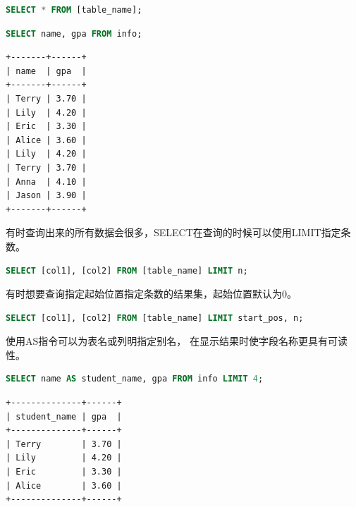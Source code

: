 \documentclass[12pt, openany, oneside]{book}
\begin{document}
\begin{lstlisting}[language=SQL]
SELECT * FROM [table_name];
\end{lstlisting}

\vspace{0.5cm}


\begin{lstlisting}[language=SQL]
SELECT name, gpa FROM info;
\end{lstlisting}

\begin{tcolorbox}
    \begin{verbatim}
+-------+------+
| name  | gpa  |
+-------+------+
| Terry | 3.70 |
| Lily  | 4.20 |
| Eric  | 3.30 |
| Alice | 3.60 |
| Lily  | 4.20 |
| Terry | 3.70 |
| Anna  | 4.10 |
| Jason | 3.90 |
+-------+------+
    \end{verbatim}
\end{tcolorbox}

有时查询出来的所有数据会很多，SELECT在查询的时候可以使用LIMIT指定条数。

\vspace{-0.5cm}

\begin{lstlisting}[language=SQL]
SELECT [col1], [col2] FROM [table_name] LIMIT n;
\end{lstlisting}

有时想要查询指定起始位置指定条数的结果集，起始位置默认为0。

\vspace{-0.5cm}

\begin{lstlisting}[language=SQL]
SELECT [col1], [col2] FROM [table_name] LIMIT start_pos, n;
\end{lstlisting}

使用AS指令可以为表名或列明指定别名， 在显示结果时使字段名称更具有可读性。 \\


\begin{lstlisting}[language=SQL]
SELECT name AS student_name, gpa FROM info LIMIT 4;
\end{lstlisting}

\begin{tcolorbox}
    \begin{verbatim}
+--------------+------+
| student_name | gpa  |
+--------------+------+
| Terry        | 3.70 |
| Lily         | 4.20 |
| Eric         | 3.30 |
| Alice        | 3.60 |
+--------------+------+
    \end{verbatim}
\end{tcolorbox}
\end{document}
